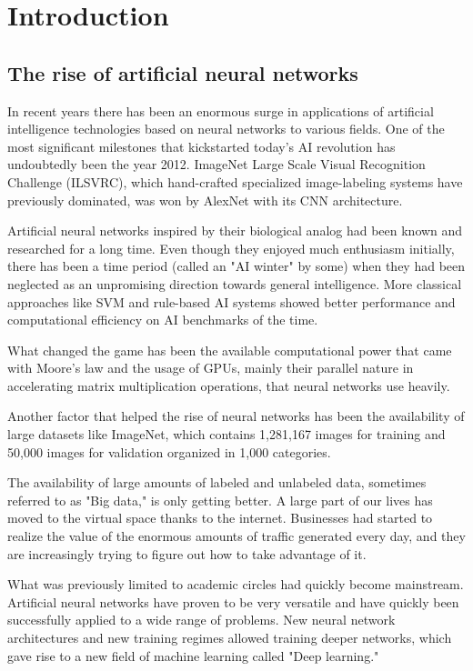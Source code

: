 \chapter{Introduction}
\label{introduction}

\section{The rise of artificial neural networks}
In recent years there has been an enormous surge in applications of artificial intelligence technologies based on neural networks to various fields. One of the most significant milestones that kickstarted today's AI revolution has undoubtedly been the year 2012. ImageNet Large Scale Visual Recognition Challenge (ILSVRC), which hand-crafted specialized image-labeling systems have previously dominated, was won by AlexNet with its CNN architecture.

Artificial neural networks inspired by their biological analog had been known and researched for a long time. Even though they enjoyed much enthusiasm initially, there has been a time period (called an "AI winter" by some) when they had been neglected as an unpromising direction towards general intelligence. More classical approaches like SVM and rule-based AI systems showed better performance and computational efficiency on AI benchmarks of the time. 

What changed the game has been the available computational power that came with Moore's law and the usage of GPUs, mainly their parallel nature in accelerating matrix multiplication operations, that neural networks use heavily.

Another factor that helped the rise of neural networks has been the availability of large datasets like ImageNet, which contains 1,281,167 images for training and 50,000 images for validation organized in 1,000 categories. 

The availability of large amounts of labeled and unlabeled data, sometimes referred to as "Big data," is only getting better. A large part of our lives has moved to the virtual space thanks to the internet. Businesses had started to realize the value of the enormous amounts of traffic generated every day, and they are increasingly trying to figure out how to take advantage of it.

What was previously limited to academic circles had quickly become mainstream. Artificial neural networks have proven to be very versatile and have quickly been successfully applied to a wide range of problems. New neural network architectures and new training regimes allowed training deeper networks, which gave rise to a new field of machine learning called "Deep learning." 

